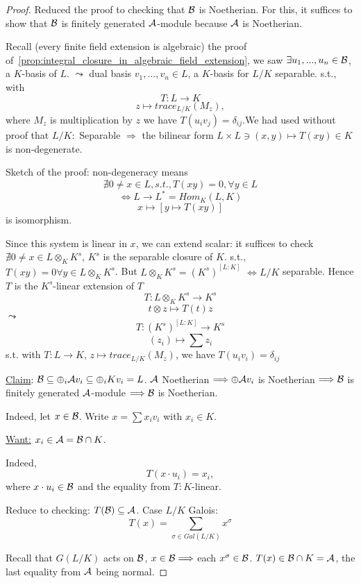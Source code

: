\documentclass[11pt]{article}
\newcommand{\cala}{{\cal A}}
\newcommand{\calb}{{\cal B}}
\newcommand{\Lrta}{\Longrightarrow}
\newcommand{\lrta}{\longrightarrow}
\newcommand{\Llrta}{\Longleftrightarrow}
\begin{document}
\begin{proof}
Reduced the proof to checking that $\calb$ is Noetherian. For this, it suffices to show that $\calb$ is finitely generated $\cala$-module because $\cala$ is Noetherian.

 Recall (every finite field extension is algebraic) the proof of~\ref{prop:integral_closure_in_algebraic_field_extension}, we saw $\exists u_1,...,u_n\in\calb$, a $K$-basis of $L$. $\leadsto$ dual basis $v_1,...,v_n\in L$, a $K$-basis for $L/K$ separable. s.t., with
 $$T:L\lrta K$$
$$z\longmapsto trace_{L/K}(M_z),$$
where $M_z$ is multiplication by $z$
we have $T(u_iv_j)=\delta_{ij}$.We had used without proof that $L/K:$ Separable $\Lrta $ the bilinear form $L\times L\ni (x,y)\longmapsto T(xy)\in K$ is non-degenerate. 

Sketch of the proof: non-degeneracy means 
$$
\nexists 0\neq x\in L, s.t., T(xy)=0,\forall y\in L
$$
$$
\Llrta L \lrta L^*=Hom_{K}(L,K)
$$
$$
x\longmapsto [y\mapsto T(xy)] 
$$
is isomorphism.

Since this system is linear in $x$, we can extend scalar: it suffices to check $\nexists 0\neq x\in L\otimes_K K^s$, $K^s$ is the separable closure of $K$. s.t., $T(xy)=0\forall y\in L\otimes_K K^s$. But $L\otimes_K K^s=(K^s)^{[L:K]}$ $\Llrta L/K$ separable. Hence $T$ is the $K^s$-linear extension of $T$
$$
T:L\otimes_K K^s\lrta K^s
$$
$$
t\otimes z\longmapsto T(t)z
$$
$\leadsto$
$$
T:(K^s)^{[L:K]}\lrta K^s
$$
$$
(z_i)\longmapsto \sum z_i
$$
s.t.  with $T:L\lrta K$, $z\longmapsto trace_{L/K}(M_z)$, we have $T(u_i v_i)=\delta_{ij}$

\underline{Claim}: $\calb\subseteq \oplus_i \cala v_i\subseteq \oplus_i K v_i=L$. $\cala$ Noetherian $\Lrta \oplus \cala v_i$ is Noetherian $\Lrta \calb$ is finitely generated $\cala$-module $\Lrta \calb$ is Noetherian.

Indeed, let $x\in \calb$. Write $x=\sum x_i v_i$ with $x_i\in K$. 

\underline{Want:} $x_i\in \cala=\calb\cap K$.

Indeed, 
$$
T(x\cdot u_i)=x_i,
$$
 where $x\cdot u_i\in\calb$ and the equality from $T:K$-linear.

Reduce to checking: $T(\calb)\subseteq \cala$. Case $L/K$ Galois:
$$
T(x)=\sum_{\sigma\in Gal(L/K)
} x^\sigma
$$

Recall that $G(L/K) $ acts on $\calb$, $x\in \calb\Lrta $ each $x^\sigma\in \calb$. $T(x)\in\calb\cap K=\cala$, the last equality from $\cala$ being normal.


\end{proof}
\end{document}
